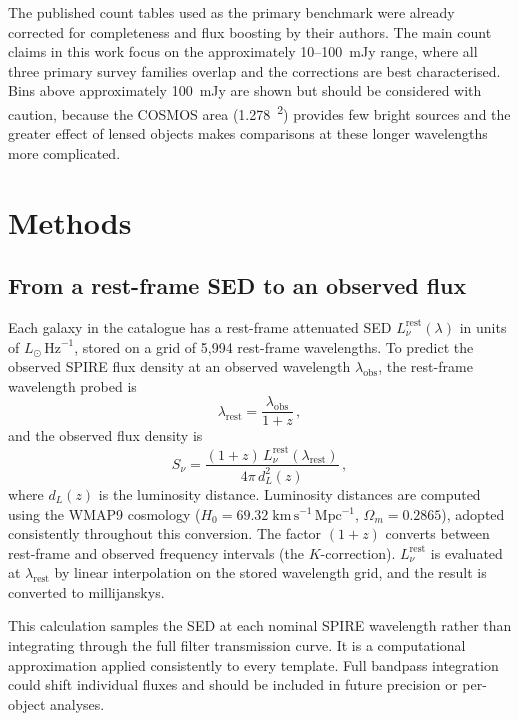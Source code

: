 \documentclass[12pt,a4paper]{article}
\begin{document}
The published count tables used as the primary benchmark were already corrected for
completeness and flux boosting by their authors. The main count claims in this work focus on
the approximately 10--\SI{100}{mJy} range, where all three primary survey families
overlap and the corrections are best characterised. Bins above approximately
\SI{100}{mJy} are shown but should be considered with caution, because the COSMOS area
(\SI{1.278}{\deg\squared}) provides few bright sources and the greater effect of lensed
objects makes comparisons at these longer wavelengths more complicated.

\section{Methods}
\label{sec:methods}

\subsection{From a rest-frame SED to an observed flux}
\label{sec:methods:flux}

Each galaxy in the \popcosmos{} catalogue has a rest-frame attenuated SED
$L_\nu^\mathrm{rest}(\lambda)$ in units of $L_\odot\,\mathrm{Hz}^{-1}$, stored on a
grid of 5,994 rest-frame wavelengths. To predict the observed SPIRE flux density at an observed wavelength $\lambda_\mathrm{obs}$, the
rest-frame wavelength probed is
\begin{equation}
  \lambda_\mathrm{rest} = \frac{\lambda_\mathrm{obs}}{1+z}\,,
  \label{eq:restlam}
\end{equation}
and the observed flux density is
\begin{equation}
  S_\nu = \frac{(1+z)\,L_\nu^\mathrm{rest}(\lambda_\mathrm{rest})}
               {4\pi\,d_L^2(z)}\,,
  \label{eq:flux}
\end{equation}
where $d_L(z)$ is the luminosity distance. Luminosity distances are computed using the
WMAP9 cosmology ($H_0 = 69.32\;\mathrm{km\,s^{-1}\,Mpc^{-1}}$,
$\Omega_m = 0.2865$), adopted consistently throughout this conversion. The factor
$(1+z)$ converts between rest-frame and observed frequency
intervals (the $K$-correction). $L_\nu^\mathrm{rest}$ is evaluated at
$\lambda_\mathrm{rest}$ by linear interpolation on the stored wavelength grid, and the
result is converted to millijanskys.

This calculation samples the SED at each nominal SPIRE wavelength rather than integrating
through the full filter transmission curve. It is a computational approximation applied
consistently to every template. Full bandpass integration could shift individual fluxes
and should be included in future precision or per-object analyses.
\end{document}
